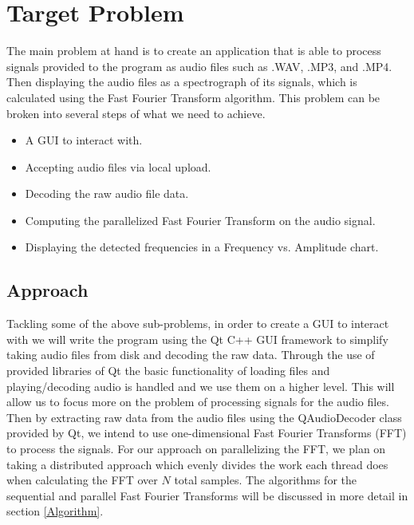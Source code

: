 \documentclass[journal]{IEEEtran}
\begin{document}
\section{Target Problem}
	\par {The main problem at hand is to create an application that is able to process signals 
	provided to the program as audio files such as .WAV, .MP3, and .MP4. Then displaying the audio 
	files as a spectrograph of its signals, which is calculated using the Fast Fourier Transform
	algorithm. This problem can be broken into several steps of 
	what we need to achieve.}

\begin{itemize}
	\item A GUI to interact with.
	\item Accepting audio files via local upload.
	\item Decoding the raw audio file data.
	\item Computing the parallelized Fast Fourier Transform on the audio signal.
	\item Displaying the detected frequencies in a Frequency vs. Amplitude chart.
\end{itemize}

\subsection{Approach}\label{Approach}
	\par {Tackling some of the above sub-problems, in order to create a GUI to interact with 
	we will write the program using the Qt C++ GUI framework to simplify taking audio files 
	from disk and decoding the raw data. Through the use of provided libraries of Qt the 
	basic functionality of loading files and playing/decoding audio is handled and we use 
	them on a higher level. This will allow us to focus more on the problem of processing 
	signals for the audio files. Then by extracting raw data from the audio files 
	using the QAudioDecoder class provided by Qt, we intend to use one-dimensional Fast 
	Fourier Transforms (FFT) to process the signals. For our approach on parallelizing the FFT,
	we plan on taking a distributed approach which evenly divides the work each thread does
	when calculating the FFT over $N$ total samples. The algorithms for the sequential and parallel 
	Fast Fourier Transforms will be discussed in more detail in section \ref{Algorithm}.
	}
\end{document}
